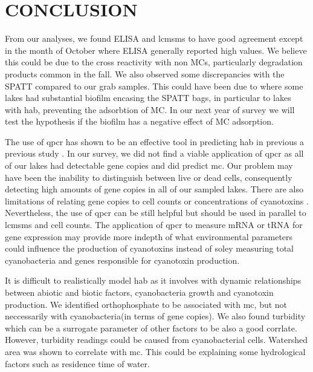 \chapter{CONCLUSION}

From our analyses, we found ELISA and \gls{lcmsms} to have good agreement except in the month of October where ELISA generally reported high values. We believe this could be due to the cross reactivity with non MCs, particularly degradation products common in the fall. We also observed some discrepancies with the SPATT compared to our grab samples. This could have been due to where some lakes had substantial biofilm encasing the SPATT bags, in particular to lakes with \gls{hab}, preventing the adsorbtion of MC. In our next year of survey we will test the hypothesis if the biofilm has a negative effect of MC adsorption.

The use of \gls{qpcr} has shown to be an effective tool in predicting \gls{hab} in previous a previous study \cite{wilson_genetic_2005}. In our survey, we did not find a viable application of \gls{qpcr} as all of our lakes had detectable gene copies and did predict \gls{mc}. Our problem may have been the inability to distinguish between live or dead cells, consequently detecting high amounts of gene copies in all of our sampled lakes. There are also limitations of relating gene copies to cell counts or concentrations of cyanotoxins \cite{pacheco_is_2016}. Nevertheless, the use of \gls{qpcr} can be still helpful but should be used in parallel to \gls{lcmsms} and cell counts.
The application of \gls{qpcr} to measure mRNA or tRNA for gene expression may provide more indepth of what environmental parameters could influence the production of cyanotoxins instead of soley measuring total cyanobacteria and genes responsible for cyanotoxin production.

It is difficult to realistically model \gls{hab} as it involves with dynamic relationships between abiotic and biotic factors, cyanobacteria growth and cyanotoxin production. We identified orthophosphate to be associated with \gls{mc}, but not neccessarily with cyanobacteria(in terms of gene copies). We also found turbidity which can be a surrogate parameter of other factors to be also a good corrlate. However, turbidity readings could be caused from cyanobacterial cells. Watershed area was shown to correlate with \gls{mc}. This could be explaining some hydrological factors such as residence time of water. 

